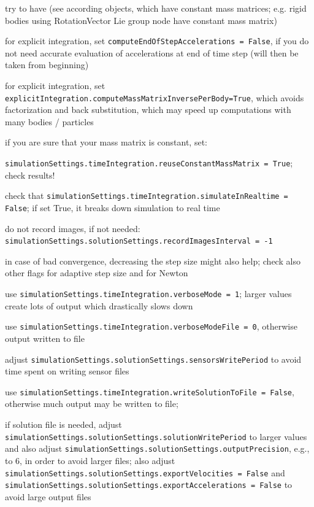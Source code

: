   \item try to have  (see according objects, which have constant mass matrices; e.g. rigid bodies using RotationVector Lie group node have constant mass matrix)
  \item for explicit integration, set \texttt{computeEndOfStepAccelerations = False}, if you do not need accurate evaluation of accelerations at end of time step (will then be taken from beginning)
  \item for explicit integration, set \texttt{explicitIntegration.computeMassMatrixInversePerBody=True}, which avoids factorization and back substitution, which may speed up computations with many bodies / particles
  \item if you are sure that your mass matrix is constant, set:
  \item[] \texttt{simulationSettings.timeIntegration.reuseConstantMassMatrix = True}; check results!
  \item check that \texttt{simulationSettings.timeIntegration.simulateInRealtime = False}; if set True, it breaks down simulation to real time
  \item do not record images, if not needed: \texttt{simulationSettings.solutionSettings.recordImagesInterval = -1}
  \item in case of bad convergence, decreasing the step size might also help; check also other flags for adaptive step size and for Newton
  \item use \texttt{simulationSettings.timeIntegration.verboseMode = 1}; larger values create lots of output which drastically slows down
  \item use \texttt{simulationSettings.timeIntegration.verboseModeFile = 0}, otherwise output written to file
  \item adjust \texttt{simulationSettings.solutionSettings.sensorsWritePeriod} to avoid time spent on writing sensor files
  \item use \texttt{simulationSettings.timeIntegration.writeSolutionToFile = False}, otherwise much output may be written to file; 
  \item if solution file is needed, adjust \texttt{simulationSettings.solutionSettings.solutionWritePeriod} to larger values and also adjust \texttt{simulationSettings.solutionSettings.outputPrecision}, e.g., to 6, in order to avoid larger files; also adjust \texttt{simulationSettings.solutionSettings.exportVelocities = False} and \texttt{simulationSettings.solutionSettings.exportAccelerations = False} to avoid large output files
\ei


